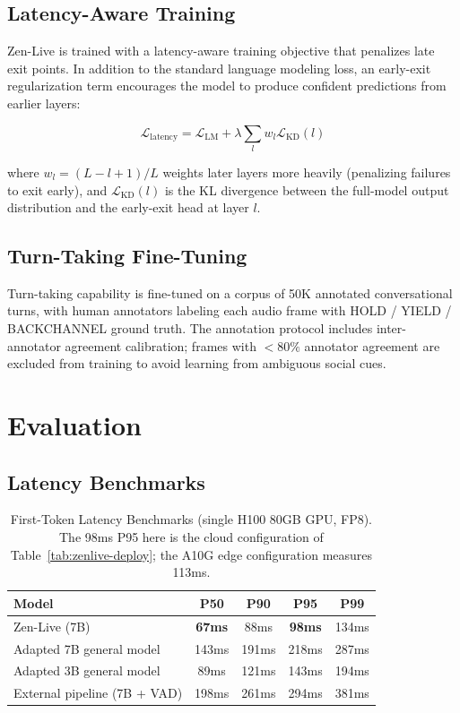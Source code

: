 \documentclass[11pt,a4paper]{article}
\begin{document}
\subsection{Latency-Aware Training}

Zen-Live is trained with a latency-aware training objective that penalizes late exit points. In addition to the standard language modeling loss, an early-exit regularization term encourages the model to produce confident predictions from earlier layers:

\begin{equation}
  \mathcal{L}_{\text{latency}} = \mathcal{L}_{\text{LM}} + \lambda \sum_l w_l \mathcal{L}_{\text{KD}}(l)
\end{equation}

where $w_l = (L - l + 1) / L$ weights later layers more heavily (penalizing failures to exit early), and $\mathcal{L}_{\text{KD}}(l)$ is the KL divergence between the full-model output distribution and the early-exit head at layer $l$.

\subsection{Turn-Taking Fine-Tuning}

Turn-taking capability is fine-tuned on a corpus of 50K annotated conversational turns, with human annotators labeling each audio frame with HOLD / YIELD / BACKCHANNEL ground truth. The annotation protocol includes inter-annotator agreement calibration; frames with $<80\%$ annotator agreement are excluded from training to avoid learning from ambiguous social cues.

\section{Evaluation}

\subsection{Latency Benchmarks}

\begin{table}[H]
\centering
\caption{First-Token Latency Benchmarks (single H100 80GB GPU, FP8).
The 98ms P95 here is the cloud configuration of Table~\ref{tab:zenlive-deploy};
the A10G edge configuration measures 113ms.}
\begin{tabular}{lcccc}
\toprule
\textbf{Model} & \textbf{P50} & \textbf{P90} & \textbf{P95} & \textbf{P99} \\
\midrule
Zen-Live (7B) & \textbf{67ms} & 88ms & \textbf{98ms} & 134ms \\
Adapted 7B general model & 143ms & 191ms & 218ms & 287ms \\
Adapted 3B general model & 89ms & 121ms & 143ms & 194ms \\
External pipeline (7B + VAD) & 198ms & 261ms & 294ms & 381ms \\
\bottomrule
\end{tabular}
\end{table}
\end{document}
